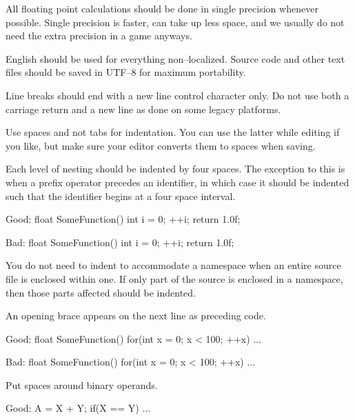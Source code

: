 \item
All floating point calculations should be done in single precision whenever possible. Single precision is faster, can take up less space, and we usually do not need the extra precision in a game anyways.
\stopitemize


\startitemize[4]
\item
English should be used for everything non--localized. Source code and other text files should be saved in UTF--8 for maximum portability.

\item
Line breaks should end with a new line control character only. Do not use both a carriage return and a new line as done on some legacy platforms.

\item
Use spaces and not tabs for indentation. You can use the latter while editing if you like, but make sure your editor converts them to spaces when saving.

\item
Each level of nesting should be indented by four spaces. The exception to this is when a prefix operator precedes an identifier, in which case it should be indented such that the identifier begins at a four space interval.

Good:
\startCodeExample
float SomeFunction()
{
    int i = 0;
  ++i;
    return 1.0f;
}
\stopCodeExample

Bad:
\startCodeExample
float SomeFunction()
{
    int i = 0;
    ++i;
    return 1.0f;
}
\stopCodeExample

\item
You do not need to indent to accommodate a namespace when an entire source file is enclosed within one. If only part of the source is enclosed in a namespace, then those parts affected should be indented.

\item
An opening brace appears on the next line as preceding code.

Good:
\startCodeExample
float SomeFunction()
{
    for(int x = 0; x < 100; ++x)
    {
        ...
    }
}
\stopCodeExample

Bad:
\startCodeExample
float SomeFunction() {
    for(int x = 0; x < 100; ++x) {
        ...
    }
}
\stopCodeExample

\item
Put spaces around binary operands.

Good:
\startCodeExample
A = X + Y;
if(X == Y)
    ...
\stopCodeExample

